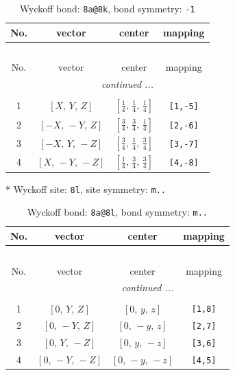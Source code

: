 \documentclass[fleqn,8pt]{jsarticle}
\begin{document}
\begin{longtable}{cccc}
\caption{Wyckoff bond: {\tt 8a@8k}, bond symmetry: {\tt -1}}
 \\
 \hline \hline
No. & vector & center & mapping \\ \hline \endfirsthead

\multicolumn{3}{l}{\tablename\ \thetable{}} \\
 \hline \hline
No. & vector & center & mapping \\ \hline \endhead

 \hline \hline
\multicolumn{3}{r}{\footnotesize\it continued ...} \\ \endfoot

 \hline \hline
\multicolumn{3}{r}{} \\ \endlastfoot

1 & $\left[ X,\, Y,\, Z \right]$ & $\left[ \frac{1}{4},\, \frac{1}{4},\, \frac{1}{4} \right]$ & {\tt [1,-5]} \\ \hline
2 & $\left[ - X,\, - Y,\, Z \right]$ & $\left[ \frac{3}{4},\, \frac{3}{4},\, \frac{1}{4} \right]$ & {\tt [2,-6]} \\ \hline
3 & $\left[ - X,\, Y,\, - Z \right]$ & $\left[ \frac{3}{4},\, \frac{1}{4},\, \frac{3}{4} \right]$ & {\tt [3,-7]} \\ \hline
4 & $\left[ X,\, - Y,\, - Z \right]$ & $\left[ \frac{1}{4},\, \frac{3}{4},\, \frac{3}{4} \right]$ & {\tt [4,-8]} \\
\end{longtable}
* Wyckoff site: {\tt 8l}, site symmetry: {\tt m..}
\renewcommand{\arraystretch}{1.2}
\begin{longtable}{cccc}
\caption{Wyckoff bond: {\tt 8a@8l}, bond symmetry: {\tt m..}}
 \\
 \hline \hline
No. & vector & center & mapping \\ \hline \endfirsthead

\multicolumn{3}{l}{\tablename\ \thetable{}} \\
 \hline \hline
No. & vector & center & mapping \\ \hline \endhead

 \hline \hline
\multicolumn{3}{r}{\footnotesize\it continued ...} \\ \endfoot

 \hline \hline
\multicolumn{3}{r}{} \\ \endlastfoot

1 & $\left[ 0,\, Y,\, Z \right]$ & $\left[ 0,\, y,\, z \right]$ & {\tt [1,8]} \\ \hline
2 & $\left[ 0,\, - Y,\, Z \right]$ & $\left[ 0,\, - y,\, z \right]$ & {\tt [2,7]} \\ \hline
3 & $\left[ 0,\, Y,\, - Z \right]$ & $\left[ 0,\, y,\, - z \right]$ & {\tt [3,6]} \\ \hline
4 & $\left[ 0,\, - Y,\, - Z \right]$ & $\left[ 0,\, - y,\, - z \right]$ & {\tt [4,5]} \\
\end{longtable}
\end{document}

